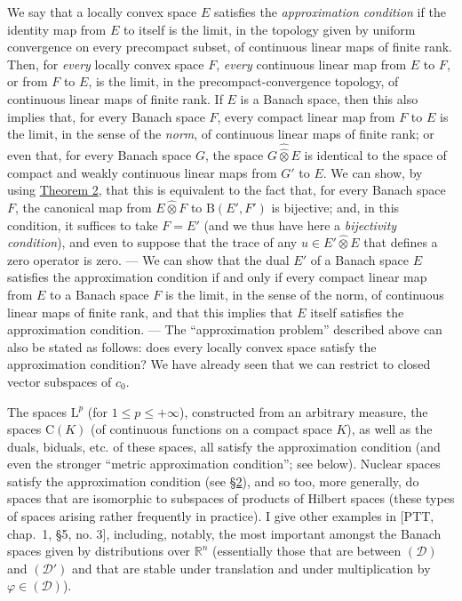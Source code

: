 \documentclass[british]{article}
\newcommand{\oldpage}[1]{\marginpar{\footnotesize$\Big\vert$ \textit{p.~#1}}}
\begin{document}
We say that a locally convex space \(E\) satisfies the
\emph{approximation condition} if the identity map from \(E\) to itself
is the limit, in the topology given by uniform convergence on every
precompact subset, of continuous linear maps of finite rank.
\oldpage{96} Then, for \emph{every} locally convex space \(F\),
\emph{every} continuous linear map from \(E\) to \(F\), or from \(F\) to
\(E\), is the limit, in the precompact-convergence topology, of
continuous linear maps of finite rank. If \(E\) is a Banach space, then
this also implies that, for every Banach space \(F\), every compact
linear map from \(F\) to \(E\) is the limit, in the sense of the
\emph{norm}, of continuous linear maps of finite rank; or even that, for
every Banach space \(G\), the space \(G\hat{\hat{\otimes}}E\) is
identical to the space of compact and weakly continuous linear maps from
\(G'\) to \(E\). We can show, by using
\hyperref[section-1-theorem-2]{Theorem 2}, that this is equivalent to
the fact that, for every Banach space \(F\), the canonical map from
\(E\hat{\otimes}F\) to \(\mathrm{B}(E',F')\) is bijective; and, in this
condition, it suffices to take \(F=E'\) (and we thus have here a
\emph{bijectivity condition}), and even to suppose that the trace of any
\(u\in E'\hat{\otimes}E\) that defines a zero operator is zero. --- We
can show that the dual \(E'\) of a Banach space \(E\) satisfies the
approximation condition if and only if every compact linear map from
\(E\) to a Banach space \(F\) is the limit, in the sense of the norm, of
continuous linear maps of finite rank, and that this implies that \(E\)
itself satisfies the approximation condition. --- The ``approximation
problem'' described above can also be stated as follows: does every
locally convex space satisfy the approximation condition? We have
already seen that we can restrict to closed vector subspaces of \(c_0\).

The spaces \(\mathrm{L}^p\) (for \(1\leqslant p\leqslant+\infty\)),
constructed from an arbitrary measure, the spaces \(\mathrm{C}(K)\) (of
continuous functions on a compact space \(K\)), as well as the duals,
biduals, etc. of these spaces, all satisfy the approximation condition
(and even the stronger ``metric approximation condition''; see below).
Nuclear spaces satisfy the approximation condition (see
\hyperref[section-2]{§2}), and so too, more generally, do spaces that
are isomorphic to subspaces of products of Hilbert spaces (these types
of spaces arising rather frequently in practice). I give other examples
in {[}PTT, chap.~1, §5, no. 3{]}, including, notably, the most important
amongst the Banach spaces given by distributions over \(\mathbb{R}^n\)
(essentially those that are between \((\mathscr{D})\) and
\((\mathscr{D}')\) and that are stable under translation and under
multiplication by \(\varphi\in(\mathscr{D})\)).
\end{document}
